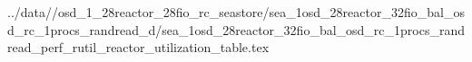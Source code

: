 ../data//osd_1_28reactor_28fio_rc_seastore/sea_1osd_28reactor_32fio_bal_osd_rc_1procs_randread_d/sea_1osd_28reactor_32fio_bal_osd_rc_1procs_randread_perf_rutil_reactor_utilization_table.tex